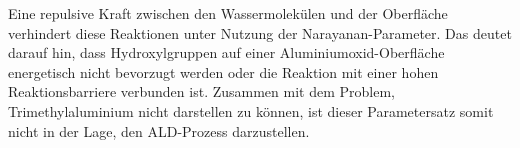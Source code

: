 Eine repulsive Kraft zwischen den Wassermolekülen und der Oberfläche verhindert diese Reaktionen unter Nutzung der Narayanan-Parameter.
Das deutet darauf hin, dass Hydroxylgruppen auf einer Aluminiumoxid-Oberfläche energetisch nicht bevorzugt werden oder die Reaktion mit einer hohen Reaktionsbarriere verbunden ist.
Zusammen mit dem Problem, Trimethylaluminium nicht darstellen zu können, ist dieser Parametersatz somit nicht in der Lage, den ALD-Prozess darzustellen.

